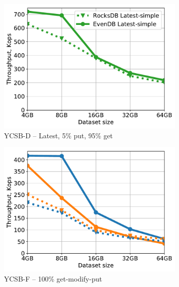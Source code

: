 \begin{figure}[tb]
\begin{subfigure}{0.33\linewidth}
\includegraphics[width=\textwidth]{figs/Workload_D_line.pdf}
\caption{YCSB-D -- Latest, 5\% put, 95\% get}
\label{fig:throughput:d}
\end{subfigure}
\begin{subfigure}{0.33\linewidth}
\includegraphics[width=\textwidth]{figs/Workload_F_line.pdf}
\caption{YCSB-F -- 100\% get-modify-put}
\label{fig:throughput:f}
\end{subfigure}
\hspace{70pt}
\begin{subfigure}{0.33\linewidth}

\end{subfigure}
\end{figure}
